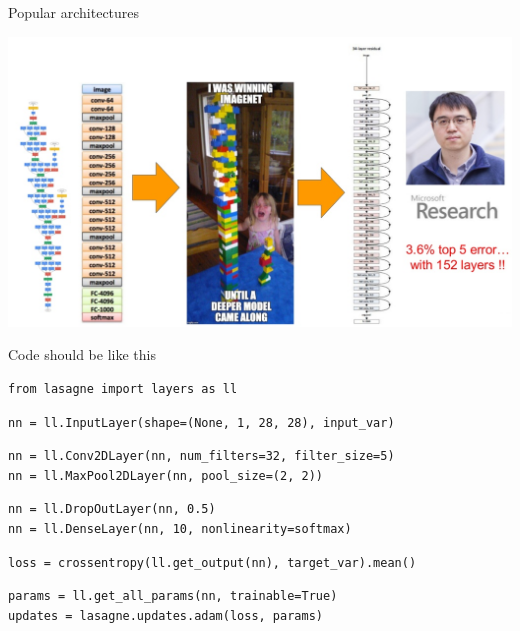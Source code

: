 \documentclass{beamer}
\begin{document}
\begin{frame}{Popular architectures}
	\begin{center}
		\includegraphics[scale=0.23]{img/im1}
	\end{center} 
\end{frame}

\begin{frame}[fragile]{Code should be like this}
	 
\begin{verbatim}
from lasagne import layers as ll
\end{verbatim}
 
\begin{verbatim}
nn = ll.InputLayer(shape=(None, 1, 28, 28), input_var)
\end{verbatim}
 
\begin{verbatim}
nn = ll.Conv2DLayer(nn, num_filters=32, filter_size=5)
nn = ll.MaxPool2DLayer(nn, pool_size=(2, 2))
\end{verbatim}
 
\begin{verbatim}
nn = ll.DropOutLayer(nn, 0.5)
nn = ll.DenseLayer(nn, 10, nonlinearity=softmax)
\end{verbatim}
 
\begin{verbatim}
loss = crossentropy(ll.get_output(nn), target_var).mean()
\end{verbatim}
 
\begin{verbatim}
params = ll.get_all_params(nn, trainable=True)
updates = lasagne.updates.adam(loss, params)
\end{verbatim}
\end{frame}
\end{document}
